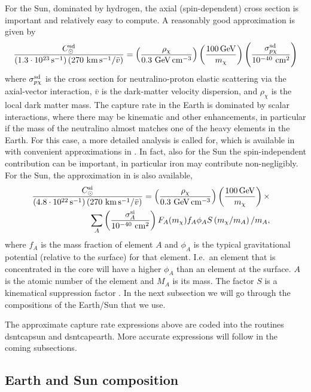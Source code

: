 \documentclass[a4paper,10pt,oneside]{book}
\newcommand{\beq}{\begin{equation}}
\newcommand{\eeq}{\end{equation}}
\newcommand{\beqa}{\begin{eqnarray}}
\newcommand{\eeqa}{\end{eqnarray}}
\newcommand{\code}[1]{\ft{#1}}
\newcommand{\ft}[1]{\textsf{#1}}
\begin{document}
For the Sun, dominated by hydrogen, the axial (spin-dependent)
cross section is important and relatively easy to compute.  A
reasonably good
approximation is given by \cite{Jungman:1995df}
\beq
      {C^{\rm sd}_\odot\over (1.3\cdot 10^{23}\, {\rm s}^{-1})
\left(270\ {\rm km\,s^{-1}}/ \bar v\right)}=
\left({\rho_\chi\over 0.3\ {\rm GeV}\,{\rm cm}^{-3}}\right)
      \left({100\,{\rm GeV}\over m_\chi}\right)
\left({\sigma_{p\chi}^{\rm sd}\over 10^{-40}\ {\rm
      cm}^2}\right)
\eeq
where $\sigma_{p\chi}^{\rm sd}$ is the cross section for
neutralino-proton elastic scattering via the axial-vector interaction,
$\bar v$ is the dark-matter velocity dispersion, and $\rho_\chi$ is
the local dark matter mass.  The capture rate in the Earth is
dominated by scalar interactions, where there may be kinematic and
other enhancements, in particular if the mass of the neutralino almost
matches one of the heavy elements in the Earth.  For this case, a more
detailed analysis is called for, which is available in \cite{Gould:1987ir}
with convenient approximations in \cite{Jungman:1995df}.
   In fact, also for the
Sun the spin-independent contribution can be important, in particular
iron may contribute non-negligibly.
For the Sun, the
  approximation in \cite{Jungman:1995df} is also available,
\beqa
      {C^{\rm si}_\odot\over (4.8\cdot 10^{22}\, {\rm s}^{-1})
\left(270\ {\rm km\,s^{-1}}/ \bar v\right)}=
\left({\rho_\chi\over 0.3\ {\rm GeV}\,{\rm cm}^{-3}}\right)
      \left({100\,{\rm GeV}\over m_\chi}\right)\times & &\nonumber\\
\sum_A\left({\sigma_{A}^{\rm si}\over 10^{-40}\ {\rm
      cm}^2}\right)F_A(m_\chi)f_A\phi_AS\left(m_\chi/m_{A}\right)/m_{A},
\eeqa
where $f_A$ is the mass fraction of element $A$ and $\phi_A$ is the
typical gravitational potential (relative to the surface) for that
element. I.e.\ an element that is concentrated in the core will have a
higher $\phi_A$ than an element at the surface. $A$ is the atomic
number of the element and $M_{A}$ is its mass. The factor $S$ is a
kinematical suppression factor \cite{Jungman:1995df,Kamionkowski:1991nj}. In the next
subsection we will go through the compositions of the Earth/Sun that
we use.

The approximate capture rate expressions above are coded into the routines
\code{dsntcapsun} and \code{dsntcapearth}. More accurate expressions
will follow in the coming subsections.


\subsection{Earth and Sun composition}
\end{document}
